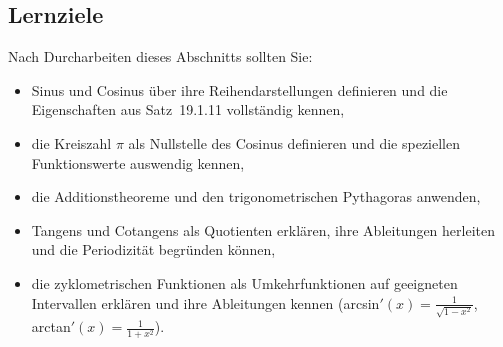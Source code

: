 \documentclass[a4paper,12pt]{article}
\begin{document}
\begin{center}
\end{center}

\subsection*{Lernziele}

Nach Durcharbeiten dieses Abschnitts sollten Sie:
\begin{itemize}
  \item Sinus und Cosinus über ihre Reihendarstellungen definieren und die
        Eigenschaften aus Satz~19.1.11 vollständig kennen,
  \item die Kreiszahl $\pi$ als Nullstelle des Cosinus definieren und die
        speziellen Funktionswerte auswendig kennen,
  \item die Additionstheoreme und den trigonometrischen Pythagoras anwenden,
  \item Tangens und Cotangens als Quotienten erklären, ihre Ableitungen herleiten
        und die Periodizität begründen können,
  \item die zyklometrischen Funktionen als Umkehrfunktionen auf geeigneten
        Intervallen erklären und ihre Ableitungen kennen (arcsin$'(x) = \frac{1}{\sqrt{1-x^2}}$,
        arctan$'(x) = \frac{1}{1+x^2}$).
\end{itemize}
\end{document}
